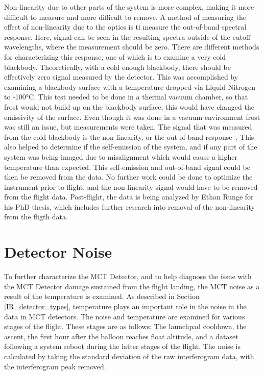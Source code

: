 Non-linearity due to other parts of the system is more complex, making it more difficult to measure and more difficult to remove. A method of measuring the effect of non-linearity due to the optics is ti measure the out-of-band spectral response. Here, signal can be seen in the resulting spectra outside of the cutoff wavelengths, where the measurement should be zero. There are different methods for characterizing this response, one of which is to examine a very cold blackbody. Theoretically, with a cold enough blackbody, there should be effectively zero signal measured by the detector. This was accomplished by examining a blackbody surface with a temperature dropped via Liquid Nitrogen to -100°C. This test needed to be done in a thermal vacuum chamber, so that frost would not build up on the blackbody surface; this would have changed the emissivity of the surface. Even though it was done in a vacuum environment frost was still an issue, but measurements were taken. The signal that was measured from the cold blackbody is the non-linearity, or the out-of-band response~\citep{non-linearity_correction}. This also helped to determine if the self-emission of the system, and if any part of the system was being imaged due to misalignment which would cause a higher temperature than expected. This self-emission and out-of-band signal could be then be removed from the data. No further work could be done to optimize the instrument prior to flight, and the non-linearity signal would have to be removed from the flight data. Post-flight, the data is being analyzed by Ethan Runge for his PhD thesis, which includes further research into removal of the non-linearity from the fligth data.

\section{Detector Noise}\label{detector_noise_flight}
To further characterize the MCT Detector, and to help diagnose the issue with the MCT Detector damage sustained from the flight landing, the MCT noise as a result of the temperature is examined. As described in Section \ref{IR_detector_types}, temperature plays an important role in the noise in the data in MCT detectors. The noise and temperature are examined for various stages of the flight. These stages are as follows: The launchpad cooldown, the ascent, the first hour after the balloon reaches float altitude, and a dataset following a system reboot during the latter stages of the flight. The noise is calculated by taking the standard deviation of the raw interferogram data, with the interferogram peak removed.

